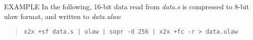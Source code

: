 \begin{options}
\end{options}

\begin{qsection}{EXAMPLE}
In the following, 16-bit data read from {\em data.s}
is compressed to 8-bit ulaw format, and written to {\em data.ulaw}
\begin{quote}
  \verb!x2x +sf data.s | ulaw | sopr -d 256 | x2x +fc -r > data.ulaw!
\end{quote}
\end{qsection}

